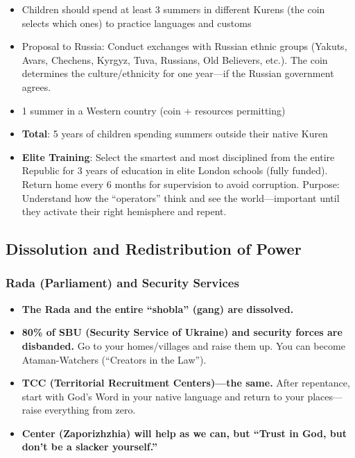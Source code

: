\documentclass[11pt,a4paper]{article}
\theoremstyle{definition}
\theoremstyle{remark}
\begin{document}
\begin{itemize}
\item Children should spend at least 3 summers in different Kurens (the coin selects which ones) to practice languages and customs
\item Proposal to Russia: Conduct exchanges with Russian ethnic groups (Yakuts, Avars, Chechens, Kyrgyz, Tuva, Russians, Old Believers, etc.). The coin determines the culture/ethnicity for one year—if the Russian government agrees.
\item 1 summer in a Western country (coin + resources permitting)
\item \textbf{Total}: 5 years of children spending summers outside their native Kuren
\item \textbf{Elite Training}: Select the smartest and most disciplined from the entire Republic for 3 years of education in elite London schools (fully funded). Return home every 6 months for supervision to avoid corruption. Purpose: Understand how the ``operators'' think and see the world—important until they activate their right hemisphere and repent.
\end{itemize}

\subsection{Dissolution and Redistribution of Power}

\subsubsection{Rada (Parliament) and Security Services}

\begin{itemize}
\item \textbf{The Rada and the entire ``shobla'' (gang) are dissolved.}
\item \textbf{80\% of SBU (Security Service of Ukraine) and security forces are disbanded.} Go to your homes/villages and raise them up. You can become Ataman-Watchers (``Creators in the Law'').
\item \textbf{TCC (Territorial Recruitment Centers)—the same.} After repentance, start with God's Word in your native language and return to your places—raise everything from zero.
\item \textbf{Center (Zaporizhzhia) will help as we can, but ``Trust in God, but don't be a slacker yourself.''}
\end{itemize}
\end{document}
